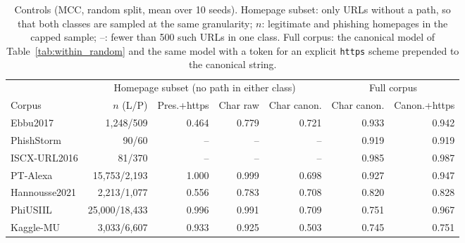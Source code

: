 \begin{table}[tp]
\centering
\caption{Controls (MCC, random split, mean over 10 seeds). Homepage subset: only URLs without a path, so that both classes are sampled at the same granularity; $n$: legitimate and phishing homepages in the capped sample; --: fewer than 500 such URLs in one class. Full corpus: the canonical model of Table~\ref{tab:within_random} and the same model with a token for an explicit \texttt{https} scheme prepended to the canonical string.}
\label{tab:controls}
\footnotesize
\begin{adjustbox}{max width=\linewidth}
\begin{tabular}{@{}lrrrrrr@{}}
\toprule
 & \multicolumn{4}{c}{Homepage subset (no path in either class)} & \multicolumn{2}{c}{Full corpus} \\
\cmidrule(lr){2-5}\cmidrule(lr){6-7}
Corpus & $n$ (L/P) & Pres.+https & Char raw & Char canon. & Char canon. & Canon.+https \\
\midrule
Ebbu2017 & 1,248/509 & 0.464 & 0.779 & 0.721 & 0.933 & 0.942 \\
PhishStorm & 90/60 & -- & -- & -- & 0.919 & 0.919 \\
ISCX-URL2016 & 81/370 & -- & -- & -- & 0.985 & 0.987 \\
PT-Alexa & 15,753/2,193 & 1.000 & 0.999 & 0.698 & 0.927 & 0.947 \\
Hannousse2021 & 2,213/1,077 & 0.556 & 0.783 & 0.708 & 0.820 & 0.828 \\
PhiUSIIL & 25,000/18,433 & 0.996 & 0.991 & 0.709 & 0.751 & 0.967 \\
Kaggle-MU & 3,033/6,607 & 0.933 & 0.925 & 0.503 & 0.745 & 0.751 \\
\bottomrule
\end{tabular}
\end{adjustbox}
\end{table}
